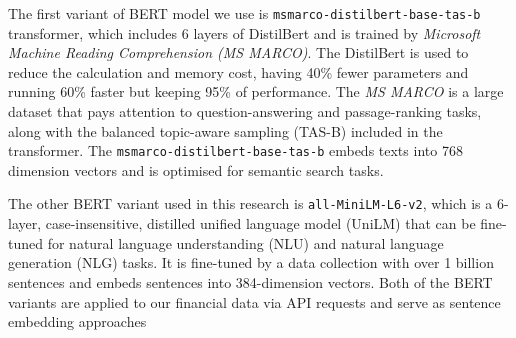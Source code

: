 The first variant of BERT model we use is \texttt{msmarco-distilbert-base-tas-b} transformer, which includes 6 layers of DistilBert and is trained by \textit{Microsoft Machine Reading Comprehension (MS MARCO)}.
The DistilBert\cite{Hofstaetter2021_tasb_dense_retrieval} is used to reduce the calculation and memory cost, having 40\% fewer parameters and running 60\% faster but keeping 95\% of performance.
The \textit{MS MARCO} is a large dataset that pays attention to question-answering and passage-ranking tasks, along with the balanced topic-aware sampling (TAS-B) included in the transformer.
The \texttt{msmarco-distilbert-base-tas-b} embeds texts into 768 dimension vectors and is optimised for semantic search tasks.

The other BERT variant used in this research is \texttt{all-MiniLM-L6-v2}, which is a 6-layer, case-insensitive, distilled unified language model (UniLM)\cite{bao2020unilmv2} that can be fine-tuned for natural language understanding (NLU) and natural language generation (NLG) tasks.
It is fine-tuned by a data collection with over 1 billion sentences and embeds sentences into 384-dimension vectors.
Both of the BERT variants are applied to our financial data via API requests and serve as sentence embedding approaches
